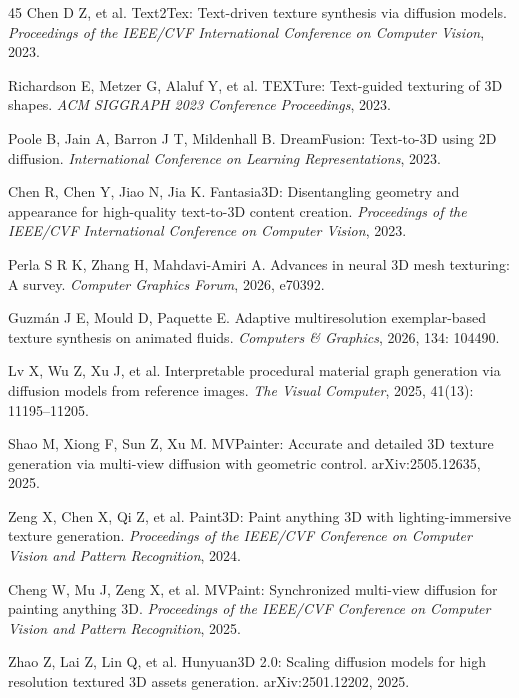 \documentclass[times,twocolumn,final]{elsarticle}
\begin{document}
\begin{thebibliography}{45}
Chen D Z, et al. Text2Tex: Text-driven texture synthesis via diffusion models. \textit{Proceedings of the IEEE/CVF International Conference on Computer Vision}, 2023.

Richardson E, Metzer G, Alaluf Y, et al. TEXTure: Text-guided texturing of 3D shapes. \textit{ACM SIGGRAPH 2023 Conference Proceedings}, 2023.

Poole B, Jain A, Barron J T, Mildenhall B. DreamFusion: Text-to-3D using 2D diffusion. \textit{International Conference on Learning Representations}, 2023.

Chen R, Chen Y, Jiao N, Jia K. Fantasia3D: Disentangling geometry and appearance for high-quality text-to-3D content creation. \textit{Proceedings of the IEEE/CVF International Conference on Computer Vision}, 2023.

Perla S R K, Zhang H, Mahdavi-Amiri A. Advances in neural 3D mesh texturing: A survey. \textit{Computer Graphics Forum}, 2026, e70392.

Guzm\'an J E, Mould D, Paquette E. Adaptive multiresolution exemplar-based texture synthesis on animated fluids. \textit{Computers \& Graphics}, 2026, 134: 104490.

Lv X, Wu Z, Xu J, et al. Interpretable procedural material graph generation via diffusion models from reference images. \textit{The Visual Computer}, 2025, 41(13): 11195--11205.

Shao M, Xiong F, Sun Z, Xu M. MVPainter: Accurate and detailed 3D texture generation via multi-view diffusion with geometric control. arXiv:2505.12635, 2025.

Zeng X, Chen X, Qi Z, et al. Paint3D: Paint anything 3D with lighting-immersive texture generation. \textit{Proceedings of the IEEE/CVF Conference on Computer Vision and Pattern Recognition}, 2024.

Cheng W, Mu J, Zeng X, et al. MVPaint: Synchronized multi-view diffusion for painting anything 3D. \textit{Proceedings of the IEEE/CVF Conference on Computer Vision and Pattern Recognition}, 2025.

Zhao Z, Lai Z, Lin Q, et al. Hunyuan3D 2.0: Scaling diffusion models for high resolution textured 3D assets generation. arXiv:2501.12202, 2025.


\end{thebibliography}
\end{document}
